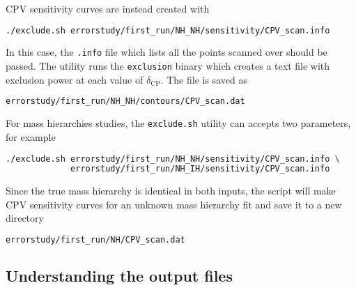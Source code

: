 \documentclass[a4paper, 11pt]{article}
\begin{document}
CPV sensitivity curves are instead created with
\begin{lstlisting}[language=bash]
	./exclude.sh errorstudy/first_run/NH_NH/sensitivity/CPV_scan.info
\end{lstlisting}
In this case, the \texttt{.info} file which lists all the points scanned over should be passed.
The utility runs the \texttt{exclusion} binary which creates a text file with exclusion power %
at each value of $\delta_\text{CP}$.
The file is saved as
\begin{lstlisting}[language=bash]
	errorstudy/first_run/NH_NH/contours/CPV_scan.dat
\end{lstlisting}

For mass hierarchies studies, the \texttt{exclude.sh} utility can accepts two parameters, for example
\begin{lstlisting}[language=bash]
	./exclude.sh errorstudy/first_run/NH_NH/sensitivity/CPV_scan.info \
		     errorstudy/first_run/NH_IH/sensitivity/CPV_scan.info
\end{lstlisting}
Since the true mass hierarchy is identical in both inputs, the script will make CPV sensitivity curves %
for an unknown mass hierarchy fit and save it to a new directory
\begin{lstlisting}[language=bash]
	errorstudy/first_run/NH/CPV_scan.dat
\end{lstlisting}

\subsection{Understanding the output files}
\end{document}
